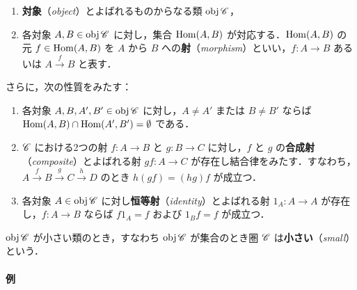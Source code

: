 \documentclass[pandoc,base=10pt,b5j,precisetext]{bxjsarticle}
\providecommand{\tightlist}{%
  \setlength{\itemsep}{0pt}\setlength{\parskip}{0pt}}
\let\oldparagraph\paragraph
\renewcommand{\paragraph}[1]{\oldparagraph{#1}\mbox{}}
\begin{document}
\begin{enumerate}
\def\labelenumi{\roman{enumi})}
\tightlist
\item
  \textbf{対象}（\emph{object}）とよばれるものからなる類
  \(\mathop{\mathrm{obj}} \mathscr{C}\)，
\item
  各対象 \(A, B \in \mathop{\mathrm{obj}} \mathscr{C}\) に対し，集合 \(\mathop{\mathrm{Hom}} (A, B)\)
  が対応する．\(\mathop{\mathrm{Hom}}(A,B)\) の元 \(f \in \mathop{\mathrm{Hom}}(A,B)\) を \(A\) から \(B\)
  への\textbf{射}（\emph{morphism}）といい，\(f \colon A \to B\)
  あるいは \(A \xrightarrow{f} B\) と表す．
\end{enumerate}

さらに，次の性質をみたす：

\begin{enumerate}
\def\labelenumi{\arabic{enumi})}
\tightlist
\item
  各対象 \(A, B, A', B' \in \mathop{\mathrm{obj}} \mathscr{C}\) に対し，\(A \neq A'\) または
  \(B \neq B'\) ならば \(\mathop{\mathrm{Hom}}(A, B) \cap \mathop{\mathrm{Hom}}(A', B') = \emptyset\)
  である．
\item
  \(\mathscr{C}\) における2つの射 \(f \colon A \to B\) と
  \(g \colon B \to C\) に対し，\(f\) と \(g\)
  の\textbf{合成射}（\emph{composite}）とよばれる射
  \(gf \colon A \to C\)
  が存在し結合律をみたす．すなわち，\(A \xrightarrow f B \xrightarrow g C \xrightarrow h D\)
  のとき \(h(gf) = (hg)f\) が成立つ．
\item
  各対象 \(A \in \mathop{\mathrm{obj}} \mathscr{C}\)
  に対し\textbf{恒等射}（\emph{identity}）とよばれる射
  \(1_A \colon A \to A\) が存在し，\(f \colon A \to B\) ならば
  \(f1_A = f\) および \(1_ B f = f\) が成立つ．
\end{enumerate}

\(\mathop{\mathrm{obj}} \mathscr{C}\) が小さい類のとき，すなわち \(\mathop{\mathrm{obj}} \mathscr{C}\)
が集合のとき圏 \(\mathscr{C}\) は\textbf{小さい}（\emph{small}）という．

\hypertarget{ux4f8b}{%
\paragraph{例}\label{ux4f8b}}
\end{document}
